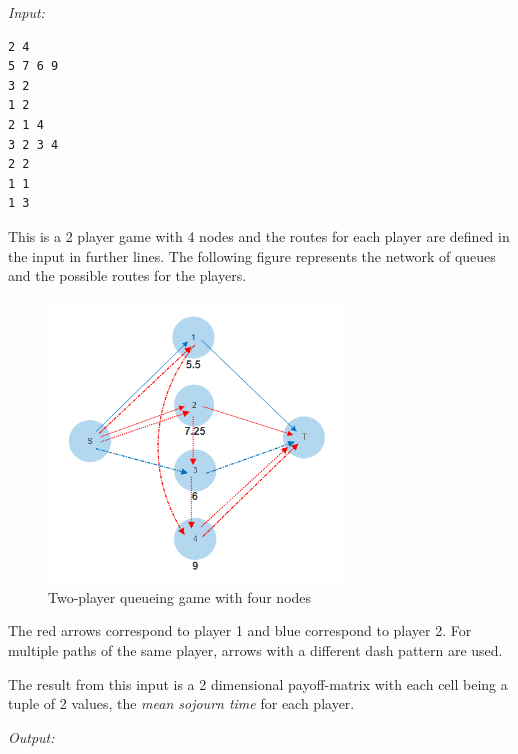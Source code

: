 \begin{example}
\textit{Input:} \\
\begin{verbatim}
2 4 
5 7 6 9 
3 2 
1 2 
2 1 4 
3 2 3 4 
2 2 
1 1 
1 3 
\end{verbatim}


This is a 2 player game with 4 nodes and the routes for each player are defined in the input in further lines.
The following figure represents the network of queues and the possible routes for the players. \\



\begin{figure}[!htbp]
\label{fig:2P3N_example}
\includegraphics[height=7.5cm]{Example1.png}
\caption{Two-player queueing game with four nodes}
\end{figure}


The red arrows correspond to player 1 and blue correspond to player 2. For multiple paths of the same player, arrows with a different dash pattern are used.

The result from this input is a 2 dimensional payoff-matrix with each cell being a tuple of 2 values, the \textit{mean sojourn time} for each player.

\noindent
\textit{Output:} \\


\end{example}
